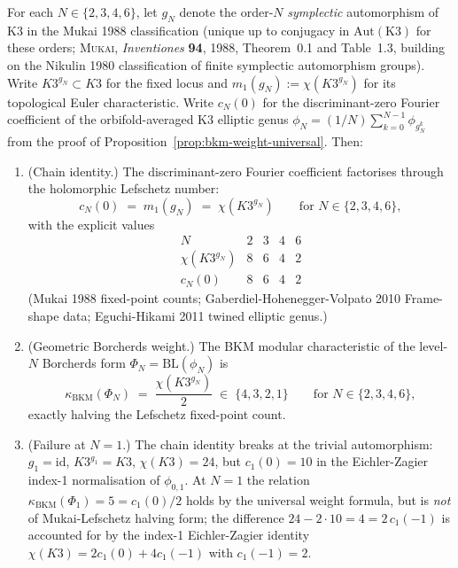 \begin{proposition}
\label{prop:mukai-lefschetz-halving}
For each $N \in \{2, 3, 4, 6\}$, let $g_N$ denote the order-$N$
\emph{symplectic} automorphism of K3 in the Mukai 1988 classification
(unique up to conjugacy in $\mathrm{Aut}(\mathrm{K3})$ for these orders;
\textsc{Mukai}, \textit{Inventiones} \textbf{94}, 1988, Theorem~0.1
and Table~1.3, building on the Nikulin 1980 classification of finite
symplectic automorphism groups). Write $K3^{g_N} \subset K3$ for the
fixed locus and $m_1(g_N) := \chi(K3^{g_N})$ for its topological Euler
characteristic. Write $c_N(0)$ for the discriminant-zero Fourier
coefficient of the orbifold-averaged K3 elliptic genus
$\phi_N = (1/N) \sum_{k=0}^{N-1} \phi_{g_N^k}$ from the proof of
Proposition~\ref{prop:bkm-weight-universal}. Then:
\begin{enumerate}[label=\textup{(\roman*)}]
 \item \textup{(Chain identity.)} The discriminant-zero Fourier coefficient
 factorises through the holomorphic Lefschetz number:
 \[
 c_N(0) \;=\; m_1(g_N) \;=\; \chi(K3^{g_N})
 \qquad \text{for } N \in \{2, 3, 4, 6\},
 \]
 with the explicit values
 \[
 \begin{array}{c|cccc}
 N & 2 & 3 & 4 & 6 \\ \hline
 \chi(K3^{g_N}) & 8 & 6 & 4 & 2 \\
 c_N(0) & 8 & 6 & 4 & 2
 \end{array}
 \]
 \textup{(Mukai 1988 fixed-point counts; Gaberdiel-Hohenegger-Volpato 2010
 Frame-shape data; Eguchi-Hikami 2011 twined elliptic genus.)}
 \item \textup{(Geometric Borcherds weight.)} The BKM modular characteristic
 of the level-$N$ Borcherds form $\Phi_N = \mathrm{BL}(\phi_N)$ is
 \[
 \kappa_{\mathrm{BKM}}(\Phi_N) \;=\; \frac{\chi(K3^{g_N})}{2}
 \;\in\; \{4, 3, 2, 1\}
 \qquad \text{for } N \in \{2, 3, 4, 6\},
 \]
 exactly halving the Lefschetz fixed-point count.
 \item \textup{(Failure at $N = 1$.)} The chain identity breaks at the
 trivial automorphism: $g_1 = \mathrm{id}$, $K3^{g_1} = K3$,
 $\chi(K3) = 24$, but $c_1(0) = 10$ in the Eichler-Zagier index-1
 normalisation of $\phi_{0,1}$. At $N = 1$ the relation
 $\kappa_{\mathrm{BKM}}(\Phi_1) = 5 = c_1(0)/2$ holds by the universal
 weight formula, but is \emph{not} of Mukai-Lefschetz halving form;
 the difference $24 - 2 \cdot 10 = 4 = 2 \, c_1(-1)$ is accounted for by the
 index-1 Eichler-Zagier identity $\chi(K3) = 2 c_1(0) + 4 c_1(-1)$
 with $c_1(-1) = 2$.
\end{enumerate}
\end{proposition}


